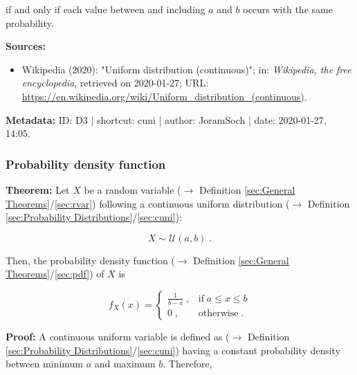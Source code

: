 \documentclass[a4paper,12pt,twoside]{book}
\begin{document}
if and only if each value between and including $a$ and $b$ occurs with the same probability.


\vspace{1em}
\textbf{Sources:}
\begin{itemize}
\item Wikipedia (2020): "Uniform distribution (continuous)"; in: \textit{Wikipedia, the free encyclopedia}, retrieved on 2020-01-27; URL: \url{https://en.wikipedia.org/wiki/Uniform_distribution_(continuous)}.
\end{itemize}


\vspace{1em}
\textbf{Metadata:} ID: D3 | shortcut: cuni | author: JoramSoch | date: 2020-01-27, 14:05.
\vspace{1em}



\subsubsection[\textbf{Probability density function}]{Probability density function} \label{sec:cuni-pdf}
\setcounter{equation}{0}

\textbf{Theorem:} Let $X$ be a random variable ($\rightarrow$ Definition \ref{sec:General Theorems}/\ref{sec:rvar}) following a continuous uniform distribution ($\rightarrow$ Definition \ref{sec:Probability Distributions}/\ref{sec:cuni}):

\begin{equation} \label{eq:cuni-pdf-cuni}
X \sim \mathcal{U}(a, b) \; .
\end{equation}

Then, the probability density function ($\rightarrow$ Definition \ref{sec:General Theorems}/\ref{sec:pdf}) of $X$ is

\begin{equation} \label{eq:cuni-pdf-cuni-pdf}
f_X(x) = \left\{
\begin{array}{rl}
\frac{1}{b-a} \; , & \text{if} \; a \leq x \leq b \\
0 \; , & \text{otherwise} \; .
\end{array}
\right.
\end{equation}


\vspace{1em}
\textbf{Proof:} A continuous uniform variable is defined as ($\rightarrow$ Definition \ref{sec:Probability Distributions}/\ref{sec:cuni}) having a constant probability density between minimum $a$ and maximum $b$. Therefore,
\end{document}
